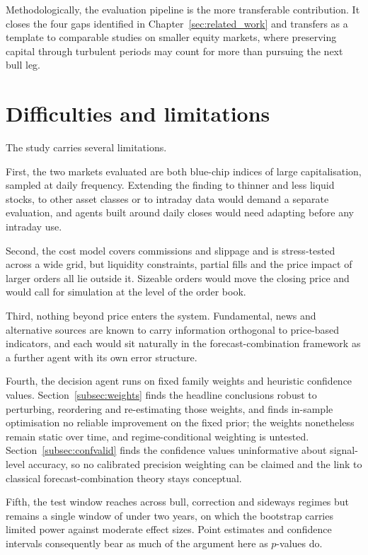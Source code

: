 Methodologically, the evaluation pipeline is the more transferable contribution. It closes the four gaps identified in Chapter~\ref{sec:related_work} and transfers as a template to comparable studies on smaller equity markets, where preserving capital through turbulent periods may count for more than pursuing the next bull leg.

\section{Difficulties and limitations}\label{sec:limitations}

The study carries several limitations.

First, the two markets evaluated are both blue-chip indices of large capitalisation, sampled at daily frequency. Extending the finding to thinner and less liquid stocks, to other asset classes or to intraday data would demand a separate evaluation, and agents built around daily closes would need adapting before any intraday use.

Second, the cost model covers commissions and slippage and is stress-tested across a wide grid, but liquidity constraints, partial fills and the price impact of larger orders all lie outside it. Sizeable orders would move the closing price and would call for simulation at the level of the order book.

Third, nothing beyond price enters the system. Fundamental, news and alternative sources are known to carry information orthogonal to price-based indicators, and each would sit naturally in the forecast-combination framework as a further agent with its own error structure.

Fourth, the decision agent runs on fixed family weights and heuristic confidence values. Section~\ref{subsec:weights} finds the headline conclusions robust to perturbing, reordering and re-estimating those weights, and finds in-sample optimisation no reliable improvement on the fixed prior; the weights nonetheless remain static over time, and regime-conditional weighting is untested. Section~\ref{subsec:confvalid} finds the confidence values uninformative about signal-level accuracy, so no calibrated precision weighting can be claimed and the link to classical forecast-combination theory stays conceptual.

Fifth, the test window reaches across bull, correction and sideways regimes but remains a single window of under two years, on which the bootstrap carries limited power against moderate effect sizes. Point estimates and confidence intervals consequently bear as much of the argument here as $p$-values do.

